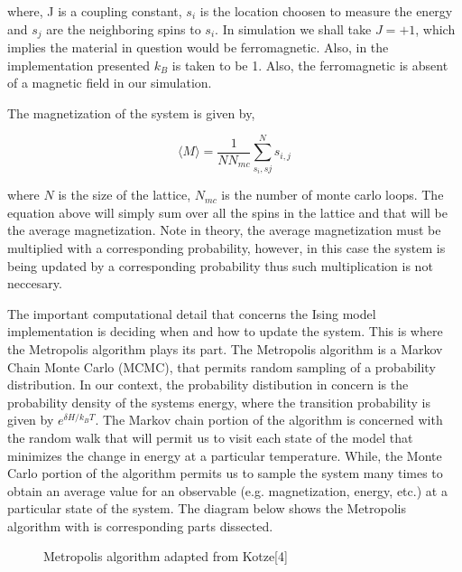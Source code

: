 \documentclass{article}
\begin{document}
where, J is a coupling constant, $s_{i}$ is the location choosen to measure the energy and $s_{j}$ are the neighboring spins to $s_{i}$. In
simulation we shall take $J = +1$, which implies the material in question would be ferromagnetic. Also, in the implementation presented $k_{B}$ is
taken to be 1. Also, the ferromagnetic is absent of a magnetic field in our simulation.

The magnetization of the system is given by,

\begin{equation} \label{eq:total_spins}
  \langle{M}\rangle = \frac{1}{NN_{mc}}\sum_{s_{i},s{j}}^{N} s_{i, j}
\end{equation}

where $N$ is the size of the lattice, $N_{mc}$ is the number of monte carlo loops. The equation above will simply sum over all the spins in
the lattice and that will be the average magnetization. Note in theory, the average magnetization must be multiplied with a corresponding
probability, however, in this case the system is being updated by a corresponding probability thus such multiplication is not neccesary.

The important computational detail that concerns the Ising model implementation is deciding when and how to update the system.
This is where the Metropolis algorithm plays its part. The Metropolis algorithm is a Markov Chain Monte Carlo (MCMC),
that permits random sampling of a probability distribution. In our context, the probability distibution in concern is the
probability density of the systems energy, where the transition probability is given by $ e^{\delta H / k_{B}T}$. The Markov chain portion
of the algorithm is concerned with the random walk that will permit us to visit each state of the model that minimizes the change in energy
at a particular temperature. While, the Monte Carlo portion of the algorithm permits us to sample the system many times to obtain
an average value for an observable (e.g. magnetization, energy, etc.) at a particular state of the system. The diagram below shows the Metropolis
algorithm with is corresponding parts dissected.

\begin{figure}[H]
  \begin{center}
  \end{center}
  \caption{Metropolis algorithm adapted from Kotze[4]}
  \label{fig:metropolis}
\end{figure}
\end{document}
